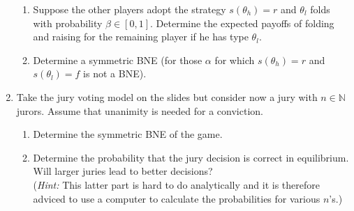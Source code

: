 \documentclass[a4paper,12pt]{article}
\begin{document}
\begin{enumerate}[resume]
\begin{enumerate}
  \item Suppose the other players adopt the strategy $s(\theta_h)=r$ and $\theta_l$ folds with probability $\beta\in[0,1]$. Determine the expected payoffs of folding and raising for the remaining player if he has type $\theta_l$.
  \item Determine a symmetric BNE (for those $\alpha$ for which $s(\theta_h)=r$ and $s(\theta_l)=f$  is not a BNE).
  \end{enumerate}
\item Take the jury voting model on the slides but consider now a jury with $n\in\mathbb{N}$ jurors. Assume that unanimity is needed for a conviction.
  \begin{enumerate}
  \item Determine the symmetric BNE of the game.
  \item Determine the probability that the jury decision is correct in equilibrium. Will larger juries lead to better decisions? \\(\emph{Hint:} This latter part is hard to do analytically and it is therefore adviced to use a computer to calculate the probabilities for various $n$'s.) 

\end{enumerate}
\end{enumerate}
\end{document}
